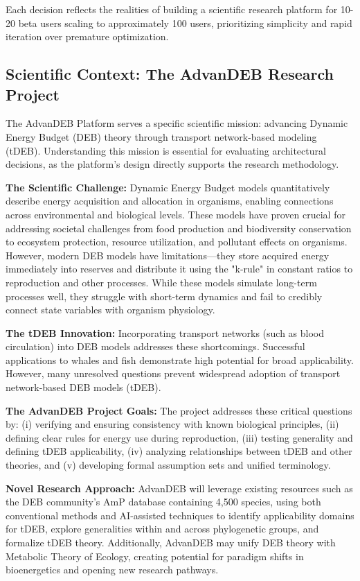 \documentclass[12pt,a4paper]{article}
\begin{document}
Each decision reflects the realities of building a scientific research platform for 10-20 beta users scaling to approximately 100 users, prioritizing simplicity and rapid iteration over premature optimization.

\subsection{Scientific Context: The AdvanDEB Research Project}

The AdvanDEB Platform serves a specific scientific mission: advancing Dynamic Energy Budget (DEB) theory through transport network-based modeling (tDEB). Understanding this mission is essential for evaluating architectural decisions, as the platform's design directly supports the research methodology.

\textbf{The Scientific Challenge:} Dynamic Energy Budget models quantitatively describe energy acquisition and allocation in organisms, enabling connections across environmental and biological levels. These models have proven crucial for addressing societal challenges from food production and biodiversity conservation to ecosystem protection, resource utilization, and pollutant effects on organisms. However, modern DEB models have limitations—they store acquired energy immediately into reserves and distribute it using the "k-rule" in constant ratios to reproduction and other processes. While these models simulate long-term processes well, they struggle with short-term dynamics and fail to credibly connect state variables with organism physiology.

\textbf{The tDEB Innovation:} Incorporating transport networks (such as blood circulation) into DEB models addresses these shortcomings. Successful applications to whales and fish demonstrate high potential for broad applicability. However, many unresolved questions prevent widespread adoption of transport network-based DEB models (tDEB).

\textbf{The AdvanDEB Project Goals:} The project addresses these critical questions by: (i) verifying and ensuring consistency with known biological principles, (ii) defining clear rules for energy use during reproduction, (iii) testing generality and defining tDEB applicability, (iv) analyzing relationships between tDEB and other theories, and (v) developing formal assumption sets and unified terminology.

\textbf{Novel Research Approach:} AdvanDEB will leverage existing resources such as the DEB community's AmP database containing 4,500 species, using both conventional methods and AI-assisted techniques to identify applicability domains for tDEB, explore generalities within and across phylogenetic groups, and formalize tDEB theory. Additionally, AdvanDEB may unify DEB theory with Metabolic Theory of Ecology, creating potential for paradigm shifts in bioenergetics and opening new research pathways.
\end{document}

